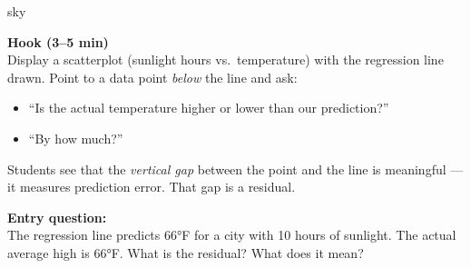 \documentclass[10pt]{article}
\begin{document}
\begin{skillbox}[Hook]{sky}
\begin{minipage}[t]{0.56\linewidth}
    \textbf{Hook (3--5 min)}\\
    Display a scatterplot (sunlight hours vs.\ temperature) with the regression line drawn.
    Point to a data point \textit{below} the line and ask:
    \begin{itemize}
        \item ``Is the actual temperature higher or lower than our prediction?''
        \item ``By how much?''
    \end{itemize}
    Students see that the \textit{vertical gap} between the point and the line is meaningful
    --- it measures prediction error. That gap is a residual.
\end{minipage}
\hfill
\begin{minipage}[t]{0.40\linewidth}
    \textbf{Entry question:}\\
    The regression line predicts 66°F for a city with 10 hours of sunlight. The actual
    average high is 66°F. What is the residual? What does it mean?
\end{minipage}
\end{skillbox}
\end{document}
